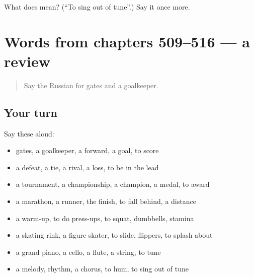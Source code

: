 \begin{tcolorbox}[breakable,colback=teal!4,colframe=teal!35!black,title={Before you move on}]
What does  mean? (\textquotedblleft{}To sing out of tune\textquotedblright{}.) Say it once more.
\end{tcolorbox}
\section[(dialogue)]{Words from chapters 509–516 — a review}

\label{lesson:RU-R516-review-509-516}



\begin{quote}
Say the Russian for gates and a goalkeeper.
\end{quote}

\subsection*{Your turn}
Say these aloud:

\begin{itemize}
\raggedright
  \item gates, a goalkeeper, a forward, a goal, to score
  \item a defeat, a tie, a rival, a loss, to be in the lead
  \item a tournament, a championship, a champion, a medal, to award
  \item a marathon, a runner, the finish, to fall behind, a distance
  \item a warm-up, to do press-ups, to squat, dumbbells, stamina
  \item a skating rink, a figure skater, to slide, flippers, to splash about
  \item a grand piano, a cello, a flute, a string, to tune
  \item a melody, rhythm, a chorus, to hum, to sing out of tune
\end{itemize}

